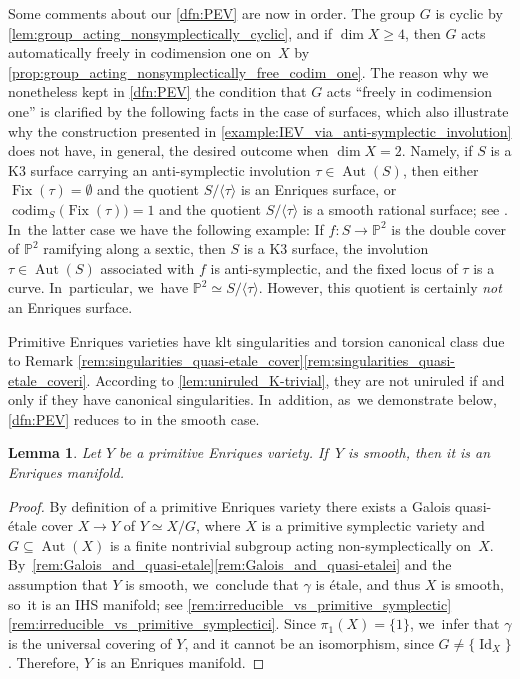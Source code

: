 \documentclass[10pt]{amsart}
\theoremstyle{plain}
\newtheorem{lem}[thm]{Lemma}
\theoremstyle{definition}
\renewcommand{\P}{\mathbb{P}}
\DeclareMathOperator{\codim}{codim}
\DeclareMathOperator{\Id}{Id}
\DeclareMathOperator{\Aut}{Aut}
\DeclareMathOperator{\Fix}{Fix}
\begin{document}
Some comments about our \autoref{dfn:PEV} are now in order. The group $G$ is cyclic by \autoref{lem:group_acting_nonsymplectically_cyclic}, and if $\dim X \geq 4$, then $G$ acts automatically freely in codimension one on~$X$ by \autoref{prop:group_acting_nonsymplectically_free_codim_one}.
The reason why we nonetheless kept in \autoref{dfn:PEV} the condition that $G$ acts \enquote{freely in codimension one}
is clarified by the following facts in the case of surfaces, which also illustrate why the construction presented in \autoref{example:IEV_via_anti-symplectic_involution} does not have, in general, the desired outcome when $\dim X = 2$. Namely, if $S$ is a K3 surface carrying an anti-symplectic involution $\tau \in \Aut(S)$, then either $\Fix(\tau) = \emptyset$ and the quotient $S / \langle \tau \rangle$ is an Enriques surface, or $\codim_S \bigl(\Fix(\tau) \bigr) = 1$ and the quotient $S / \langle \tau \rangle$ is a smooth rational surface; see \cite[\S 3]{AST11}. In~the latter case we have the following example:
If $f \colon S \to \P^2$ is the double cover of $\P^2$ ramifying along a sextic, then $S$ is a K3 surface, the involution $\tau \in \Aut(S)$ associated with $f$ is anti-symplectic, and the fixed locus of $\tau$ is a curve. In~particular, we~have $\P^2 \simeq S / \langle \tau \rangle$. However, this quotient is certainly \emph{not} an Enriques surface.

Primitive Enriques varieties have klt singularities and torsion canonical class due to Remark \ref{rem:singularities_quasi-etale_cover}\eqref{rem:singularities_quasi-etale_coveri}. According to \autoref{lem:uniruled_K-trivial}, they are not uniruled if and only if they have canonical singularities. In~addition, as~we demonstrate below, \autoref{dfn:PEV} reduces to \cite[Def.\,2.1]{OS11a} in the smooth case.

\begin{lem}
\label{lem:smooth_PEV}
Let $Y$ be a primitive Enriques variety. If~$Y$ is smooth, then it is an Enriques manifold.
\end{lem}

\begin{proof}
By definition of a primitive Enriques variety there exists a Galois quasi-étale cover $X \to Y$ of $Y \simeq X / G$, where $X$ is a primitive symplectic variety and $G \subseteq \Aut(X)$ is a finite nontrivial subgroup acting non-symplectically on~$X$. By~\autoref{rem:Galois_and_quasi-etale}\eqref{rem:Galois_and_quasi-etalei} and the assumption that $Y$ is smooth, we~conclude that $\gamma$ is étale, and thus $X$ is smooth, so~it is an IHS manifold; see \autoref{rem:irreducible_vs_primitive_symplectic}\eqref{rem:irreducible_vs_primitive_symplectici}. Since $\pi_1(X) = \{ 1 \}$, we~infer that $\gamma$ is the universal covering of $Y$, and it cannot be an isomorphism, since $G \neq \{ \Id_X \}$. Therefore, $Y$ is an Enriques manifold.
\end{proof}
\end{document}
